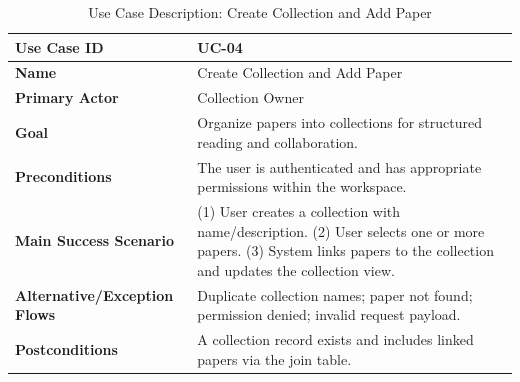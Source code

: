 \begin{table}[H]
    \centering
    \small
    \begin{tabularx}{\textwidth}{|l|X|}
        \hline
        \textbf{Use Case ID}                 & UC-04                                                                                                                                                                \\
        \hline
        \textbf{Name}                        & Create Collection and Add Paper                                                                                                                                      \\
        \hline
        \textbf{Primary Actor}               & Collection Owner                                                                                                                                                     \\
        \hline
        \textbf{Goal}                        & Organize papers into collections for structured reading and collaboration.                                                                                           \\
        \hline
        \textbf{Preconditions}               & The user is authenticated and has appropriate permissions within the workspace.                                                                                      \\
        \hline
        \textbf{Main Success Scenario}       & (1) User creates a collection with name/description. (2) User selects one or more papers. (3) System links papers to the collection and updates the collection view. \\
        \hline
        \textbf{Alternative/Exception Flows} & Duplicate collection names; paper not found; permission denied; invalid request payload.                                                                             \\
        \hline
        \textbf{Postconditions}              & A collection record exists and includes linked papers via the join table.                                                                                            \\
        \hline
    \end{tabularx}
    \caption{Use Case Description: Create Collection and Add Paper}
    \label{tab:uc-04}
\end{table}

